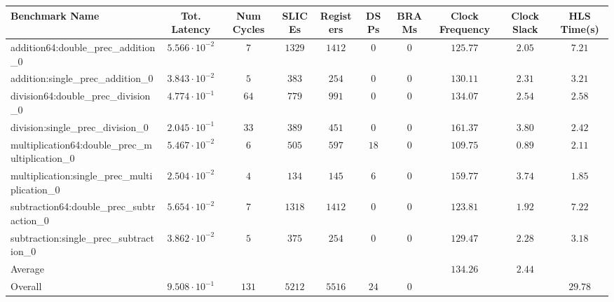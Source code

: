 \begin{tabular}{|l|c|c|c|c|c|c|c|c|c|}
\hline
Benchmark Name                                   & Tot. Latency            & Num Cycles & SLICEs   & Registers & DSPs   & BRAMs & Clock Frequency & Clock Slack & HLS Time(s) \\
\hline
addition64:double\_prec\_addition\_0             & $ 5.566 \cdot 10^{-2} $ & $ 7      $ & $ 1329 $ & $ 1412  $ & $ 0  $ & $ 0 $ & $ 125.77      $ & $ 2.05    $ & $ 7.21    $ \\
addition:single\_prec\_addition\_0               & $ 3.843 \cdot 10^{-2} $ & $ 5      $ & $ 383  $ & $ 254   $ & $ 0  $ & $ 0 $ & $ 130.11      $ & $ 2.31    $ & $ 3.21    $ \\
division64:double\_prec\_division\_0             & $ 4.774 \cdot 10^{-1} $ & $ 64     $ & $ 779  $ & $ 991   $ & $ 0  $ & $ 0 $ & $ 134.07      $ & $ 2.54    $ & $ 2.58    $ \\
division:single\_prec\_division\_0               & $ 2.045 \cdot 10^{-1} $ & $ 33     $ & $ 389  $ & $ 451   $ & $ 0  $ & $ 0 $ & $ 161.37      $ & $ 3.80    $ & $ 2.42    $ \\
multiplication64:double\_prec\_multiplication\_0 & $ 5.467 \cdot 10^{-2} $ & $ 6      $ & $ 505  $ & $ 597   $ & $ 18 $ & $ 0 $ & $ 109.75      $ & $ 0.89    $ & $ 2.11    $ \\
multiplication:single\_prec\_multiplication\_0   & $ 2.504 \cdot 10^{-2} $ & $ 4      $ & $ 134  $ & $ 145   $ & $ 6  $ & $ 0 $ & $ 159.77      $ & $ 3.74    $ & $ 1.85    $ \\
subtraction64:double\_prec\_subtraction\_0       & $ 5.654 \cdot 10^{-2} $ & $ 7      $ & $ 1318 $ & $ 1412  $ & $ 0  $ & $ 0 $ & $ 123.81      $ & $ 1.92    $ & $ 7.22    $ \\
subtraction:single\_prec\_subtraction\_0         & $ 3.862 \cdot 10^{-2} $ & $ 5      $ & $ 375  $ & $ 254   $ & $ 0  $ & $ 0 $ & $ 129.47      $ & $ 2.28    $ & $ 3.18    $ \\
\hline
Average                                          & $                     $ & $        $ & $      $ & $       $ & $    $ & $   $ & $ 134.26      $ & $ 2.44    $ & $         $ \\
\hline
Overall                                          & $ 9.508 \cdot 10^{-1} $ & $ 131    $ & $ 5212 $ & $ 5516  $ & $ 24 $ & $ 0 $ & $             $ & $         $ & $ 29.78   $ \\
\hline
\end{tabular}
